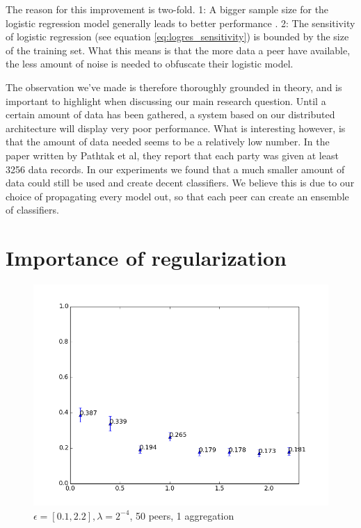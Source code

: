 The reason for this improvement is two-fold. 1: A bigger sample size for the logistic regression model generally leads to better performance \cite{peduzzi1996simulation}. 2: The sensitivity of logistic regression (see equation \ref{eq:logres_sensitivity}) is bounded by the size of the training set. What this means is that the more data a peer have available, the less amount of noise is needed to obfuscate their logistic model. 

The observation we've made is therefore thoroughly grounded in theory, and is important to highlight when discussing our main research question. Until a certain amount of data has been gathered, a system based on our distributed architecture will display very poor performance. What is interesting however, is that the amount of data needed seems to be a relatively low number. In the paper written by Pathtak et al\cite{pathak2010diffprivhomo}, they report that each party was given at least 3256 data records. In our experiments we found that a much smaller amount of data could still be used and create decent classifiers. We believe this is due to our choice of propagating every model out, so that each peer can create an ensemble of classifiers. 

\section{Importance of regularization}

\begin{figure}[h!]
	\centering
	\includegraphics[width=\textwidth]{fig/eps0.1-2.2,bud=eps,peers50,groups50,reg2e-4}
	\caption{$\epsilon = [0.1, 2.2], \lambda = 2^{-4}$, 50 peers, 1 aggregation}
	\label{fig:linear_epsilon_range}
\end{figure}

